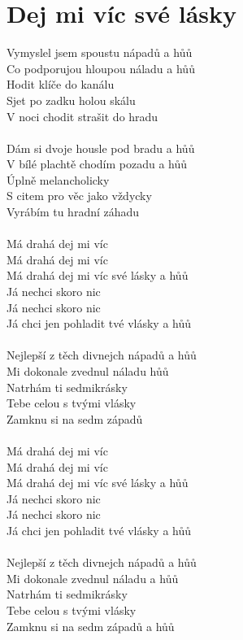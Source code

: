 \section{Dej mi víc své lásky}
Vymyslel jsem spoustu nápadů a hůů\\
Co podporujou hloupou náladu a hůů\\
Hodit klíče do kanálu\\
Sjet po zadku holou skálu\\
V noci chodit strašit do hradu\\
\\
Dám si dvoje housle pod bradu a hůů\\
V bílé plachtě chodím pozadu a hůů\\
Úplně melancholicky\\
S citem pro věc jako vždycky\\
Vyrábím tu hradní záhadu\\
\\
Má drahá dej mi víc\\
Má drahá dej mi víc\\
Má drahá dej mi víc své lásky a hůů\\
Já nechci skoro nic\\
Já nechci skoro nic\\
Já chci jen pohladit tvé vlásky a hůů\\
\\
Nejlepší z těch divnejch nápadů a hůů\\
Mi dokonale zvednul náladu hůů\\
Natrhám ti sedmikrásky\\
Tebe celou s tvými vlásky\\
Zamknu si na sedm západů\\
\\
Má drahá dej mi víc \\
Má drahá dej mi víc \\
Má drahá dej mi víc své lásky a hůů\\
Já nechci skoro nic \\
Já nechci skoro nic\\
Já chci jen pohladit tvé vlásky a hůů\\
\\
Nejlepší z těch divnejch nápadů a hůů\\
Mi dokonale zvednul náladu a hůů\\
Natrhám ti sedmikrásky\\
Tebe celou s tvými vlásky\\
Zamknu si na sedm západů a hůů\\
